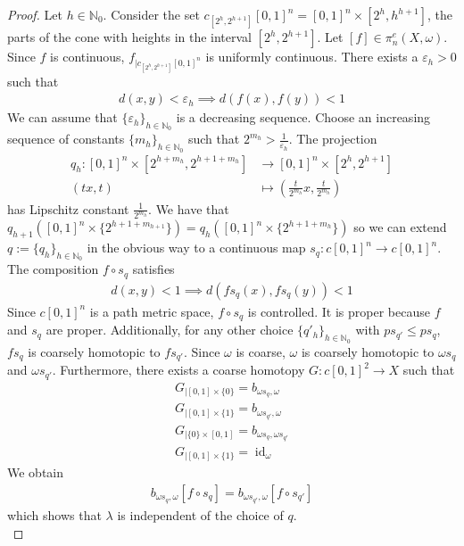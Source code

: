 \documentclass[a4paper,11pt]{article}
\theoremstyle{definition}
\theoremstyle{plain}
\theoremstyle{remark}
\DeclareMathOperator{\id}{id}
\begin{document}
{\begin{proof} Let $h\in \mathbb{N}_{0}$. Consider the set $c_{[2^h,2^{h+1}]}[0,1]^n = [0,1]^n \times [2^h,h^{h+1}]$, the parts of the cone with heights in the interval $[2^{h},2^{h+1}]$. Let $[f]\in \pi_{n}^{e}(X,\omega)$. Since $f$ is continuous, $f_{|c_{[2^h,2^{h+1}]}[0,1]^n}$ is uniformly continuous. There exists a $\varepsilon_{h}>0$ such that 
\begin{align*}
d(x,y)< \varepsilon_{h} \implies d(f(x),f(y))<1
\end{align*}
We can assume that $\{\varepsilon_{h}\}_{h\in \mathbb{N}_{0}}$ is a decreasing sequence. Choose an increasing sequence of constants $\{m_{h}\}_{h\in \mathbb{N}_{0}}$ such that $2^{m_{h}}> \frac{1}{\varepsilon_{h}}$. The projection
\begin{align*}
q_{h}: [0,1]^n \times [2^{h+m_{h}}, 2^{h+1+m_{h}}] &\rightarrow [0,1]^n \times [2^{h}, 2^{h+1}]\\
 (tx,t)&\mapsto (\frac{t}{2^{m_{h}}}x, \frac{t}{2^{m_{h}}})
\end{align*}
has Lipschitz constant $\frac{1}{2^{m_{h}}}$. We have that $q_{h+1}([0,1]^n \times \{2^{h+1+m_{h+1}}\}) = q_{h}([0,1]^n \times \{2^{h+1+m_h}\})$ so we can extend $q:=\{q_{h}\}_{h\in \mathbb{N}_{0}}$ in the obvious way to a continuous map $s_{q}: c[0,1]^n \rightarrow c[0,1]^n$. The composition $f\circ s_{q}$ satisfies
\begin{align*}
d(x,y)< 1 \implies d(fs_{q}(x),fs_{q}(y))<1
\end{align*}
Since $c[0,1]^n$ is a path metric space, $f\circ s_{q}$ is controlled. It is proper because $f$ and $s_{q}$ are proper. Additionally, for any other choice $\{q'_{h}\}_{h\in \mathbb{N}_{0}}$ with $ps_{q'}\leq ps_{q}$, $fs_{q}$ is coarsely homotopic to $fs_{q'}$. Since $\omega$ is coarse, $\omega$ is coarsely homotopic to $\omega s_{q}$ and $\omega s_{q'}$. Furthermore, there exists a coarse homotopy $G: c[0,1]^2\rightarrow X$ such that 
\begin{align*}
G_{| [0,1] \times \{0\}} = b_{\omega s_{q},\omega}\\
G_{| [0,1] \times \{1\}} = b_{\omega s_{q'},\omega}\\
G_{| \{0\} \times [0,1]} = b_{\omega s_{q}, \omega s_{q'}}\\
G_{| [0,1] \times \{1\}} = \id_{\omega}
\end{align*}We obtain 
\begin{align*}
b_{\omega s_{q},\omega} [f\circ s_{q}] = b_{\omega s_{q'},\omega}[f\circ s_{q'}] 
\end{align*}
which shows that $\lambda$ is independent of the choice of $q$. \\


\end{proof}}
\end{document}
